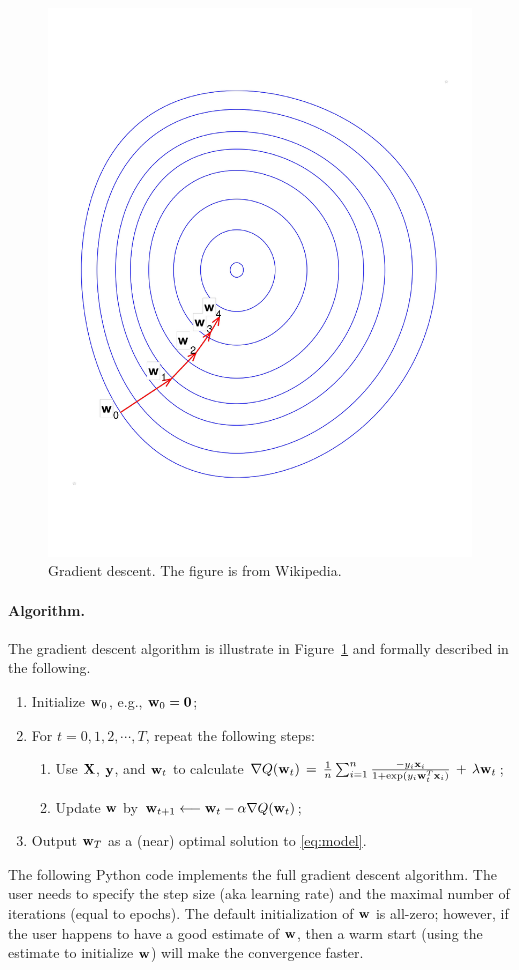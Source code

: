 \documentclass[11pt]{article}
\numberwithin{equation}{section}
\def\w{{\bf w}}
\def\X{{\bf X}}
\def\x{{\bf x}}
\def\y{{\bf y}}
\def\0{{\bf 0}}
\begin{document}
\begin{figure}[!h]
	\centering
	\includegraphics[width=0.5\linewidth]{figures/gradient_descent.pdf}
	\caption{Gradient descent.
		The figure is from Wikipedia.}
	\label{fig:gradient_descent}
\end{figure}


\paragraph{Algorithm.}
The gradient descent algorithm is illustrate in Figure~\ref{fig:gradient_descent} and formally described in the following.
\begin{enumerate}
	\item 
	Initialize $\w_0$, e.g., $\w_0 = \0$;
	\item
	For $t = 0, 1, 2, \cdots , T$, repeat the following steps:
	\begin{enumerate}
		\item 
		Use $\X$, $\y$, and $\w_t$ to calculate
		$\nabla Q (\w_t) \, = \, \frac{1}{n} \sum_{i=1}^n \frac{ - y_i \x_i }{1+\exp({y_i \w_t^T \x_i})} \, + \, \lambda \w_t $;
		\item
		Update $\w$ by
		$\w_{t+1} \longleftarrow \w_t - \alpha \nabla Q (\w_t)$;
	\end{enumerate}
	\item
	Output $\w_{T}$ as a (near) optimal solution to \eqref{eq:model}.
\end{enumerate}






The following Python code implements the full gradient descent algorithm.
The user needs to specify the step size (aka learning rate) and the maximal number of iterations (equal to epochs).
The default initialization of $\w$ is all-zero;
however, if the user happens to have a good estimate of $\w$, then a warm start (using the estimate to initialize $\w$) will make the convergence faster.
\end{document}
